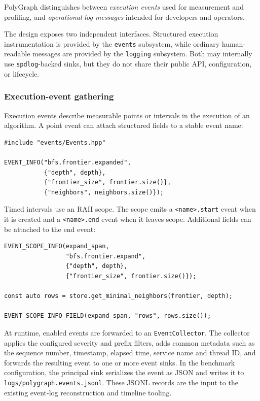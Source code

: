 \documentclass[11pt,a4paper]{article}
\begin{document}
PolyGraph distinguishes between \emph{execution events} used for measurement and
profiling, and \emph{operational log messages} intended for developers and
operators.  

The design exposes two independent interfaces. Structured execution
instrumentation is provided by the \texttt{events} subsystem, while ordinary
human-readable messages are provided by the \texttt{logging} subsystem.  Both may
internally use \texttt{spdlog}-backed sinks, but they do not share their public API,
configuration, or lifecycle.

\subsubsection{Execution-event gathering}

Execution events describe measurable points or intervals in the execution of an
algorithm. A point event can attach structured fields to a stable event name:

\begin{lstlisting}[style=cpp]
#include "events/Events.hpp"

EVENT_INFO("bfs.frontier.expanded",
           {"depth", depth},
           {"frontier_size", frontier.size()},
           {"neighbors", neighbors.size()});
\end{lstlisting}

Timed intervals use an RAII scope. The scope emits a
\texttt{<name>.start} event when it is created and a \texttt{<name>.end} event
when it leaves scope. Additional fields can be attached to the end event:

\begin{lstlisting}[style=cpp]
EVENT_SCOPE_INFO(expand_span,
                 "bfs.frontier.expand",
                 {"depth", depth},
                 {"frontier_size", frontier.size()});

const auto rows = store.get_minimal_neighbors(frontier, depth);

EVENT_SCOPE_INFO_FIELD(expand_span, "rows", rows.size());
\end{lstlisting}

At runtime, enabled events are forwarded to an \texttt{EventCollector}. The
collector applies the configured severity and prefix filters, adds common metadata
such as the sequence number, timestamp, elapsed time, service name and thread ID,
and forwards the resulting event to one or more event sinks. In the benchmark
configuration, the principal sink serializes the event as JSON and writes it to
\texttt{logs/polygraph.events.jsonl}. These JSONL records are the input to the
existing event-log reconstruction and timeline tooling.
\end{document}
